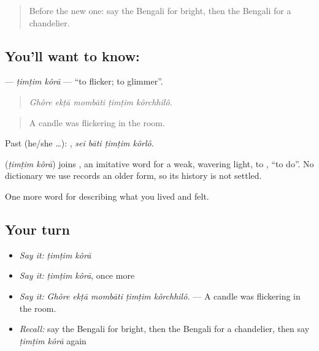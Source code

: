 \label{lesson:BN-C505-timtim-kora}



\begin{quote}
Before the new one: say the Bengali for bright, then the Bengali for a chandelier.
\end{quote}

\subsection*{You'll want to know:  }
\textbf{ } — \emph{ṭimṭim kôrā} — \textquotedblleft{}to flicker; to glimmer\textquotedblright{}.

\begin{quote}
    
\end{quote}

\begin{quote}
\emph{Ghôre ekṭā mombāti ṭimṭim kôrchhilô.}
\end{quote}

\begin{quote}
A candle was flickering in the room.
\end{quote}

Past (he/she …):    , \emph{sei bāti ṭimṭim kôrlô}.

\begin{cousinweb}
\textbf{ } (\emph{ṭimṭim kôrā}) joins , an imitative word for a weak, wavering light, to , \textquotedblleft{}to do\textquotedblright{}. No dictionary we use records an older form, so its history is not settled.
\end{cousinweb}

\begin{grammarlens}[title={What you've built}]
One more word for describing what you lived and felt.
\end{grammarlens}

\subsection*{Your turn}
\begin{itemize}
\raggedright
  \item \emph{Say it:} \emph{ṭimṭim kôrā}
  \item \emph{Say it:} \emph{ṭimṭim kôrā}, once more
  \item \emph{Say it:} \emph{Ghôre ekṭā mombāti ṭimṭim kôrchhilô.} — A candle was flickering in the room.
  \item \emph{Recall:} say the Bengali for bright, then the Bengali for a chandelier, then say \emph{ṭimṭim kôrā} again
\end{itemize}

